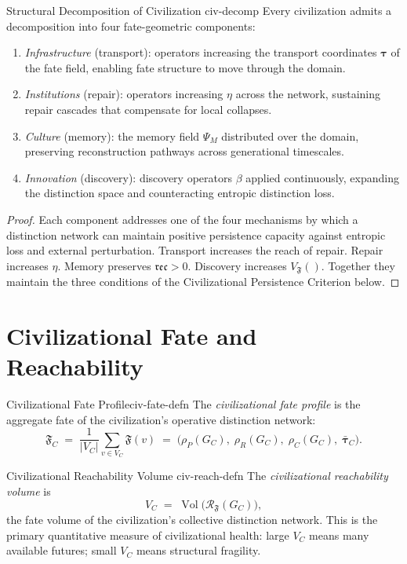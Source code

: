 \documentclass[12pt,twoside,openright]{book}
\newcommand{\reco}{\mathfrak{rec}}        %
\newcommand{\Vol}{\operatorname{Vol}}     %
\newcommand{\fateMap}{\mathfrak{F}}
\newcommand{\repEff}{\eta}               %
\providecommand{\fateReach}[1]{\mathcal{R}_{\fateMap}(#1)}
\providecommand{\fateVol}[1]{V_{\fateMap}(#1)}
\providecommand{\discOp}{\beta}
\providecommand{\collapDens}[1]{\rho_{C}(#1)}
\providecommand{\repairDens}[1]{\rho_{R}(#1)}
\providecommand{\persistDens}[1]{\rho_{P}(#1)}
\providecommand{\memField}{\Psi_{M}}
\providecommand{\distNet}{G}
\providecommand{\distNetV}{V}
\providecommand{\civFate}{\mathfrak{F}_{C}}
\providecommand{\civReach}{V_{C}}
\begin{document}
\begin{proposition}{Structural Decomposition of Civilization}%
  {civ-decomp}
Every civilization admits a decomposition into four fate-geometric
components:
\begin{enumerate}[nosep,label=(\roman*)]
  \item \emph{Infrastructure} (transport): operators increasing
    the transport coordinates $\boldsymbol{\tau}$ of the fate
    field, enabling fate structure to move through the domain.
  \item \emph{Institutions} (repair): operators increasing
    $\repEff$ across the network, sustaining repair cascades
    that compensate for local collapses.
  \item \emph{Culture} (memory): the memory field $\memField$
    distributed over the domain, preserving reconstruction
    pathways across generational timescales.
  \item \emph{Innovation} (discovery): discovery operators
    $\discOp$ applied continuously, expanding the distinction
    space and counteracting entropic distinction loss.
\end{enumerate}
\begin{proof}
Each component addresses one of the four mechanisms by which
a distinction network can maintain positive persistence
capacity against entropic loss and external perturbation.
Transport increases the reach of repair. Repair increases
$\repEff$. Memory preserves $\reco>0$. Discovery increases
$\fateVol{}$. Together they maintain the three conditions
of the Civilizational Persistence Criterion below.
\end{proof}
\end{proposition}

\section{Civilizational Fate and Reachability}

\begin{definition}{Civilizational Fate Profile}{civ-fate-defn}
The \emph{civilizational fate profile} is the aggregate fate
of the civilization's operative distinction network:
\[
  \civFate
  \;=\;
  \frac{1}{|\distNetV_C|}
  \sum_{v\in\distNetV_C}\fateMap(v)
  \;=\;
  \bigl(
    \persistDens{\distNet_C},\;
    \repairDens{\distNet_C},\;
    \collapDens{\distNet_C},\;
    \bar{\boldsymbol{\tau}}_C
  \bigr).
\]
\end{definition}

\begin{definition}{Civilizational Reachability Volume}%
  {civ-reach-defn}
The \emph{civilizational reachability volume} is
\[
  \civReach
  \;=\;
  \Vol\bigl(\fateReach{\distNet_C}\bigr),
\]
the fate volume of the civilization's collective distinction
network. This is the primary quantitative measure of
civilizational health: large $\civReach$ means many available
futures; small $\civReach$ means structural fragility.
\end{definition}
\end{document}
